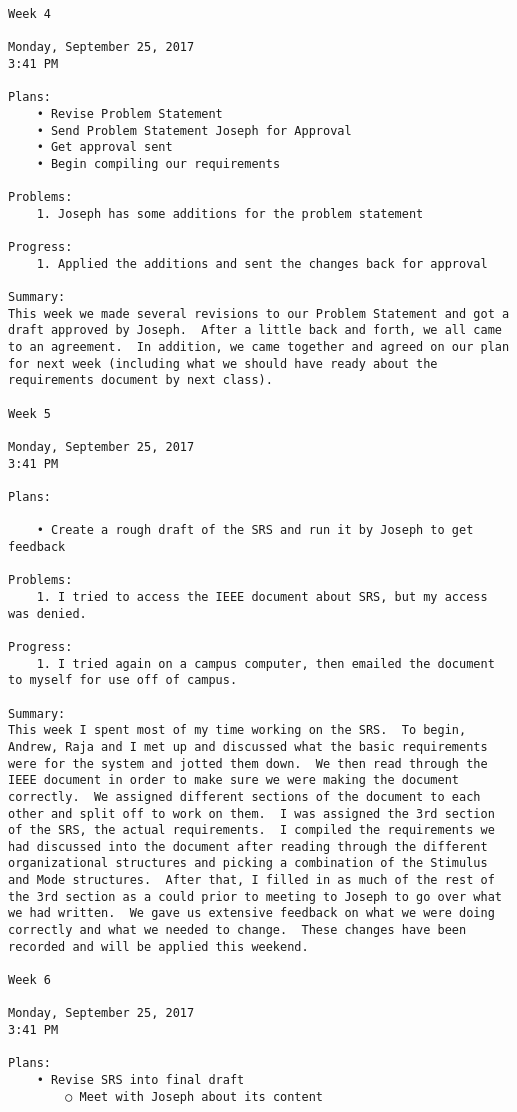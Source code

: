\begin{lstlisting}
Week 4

Monday, September 25, 2017
3:41 PM

Plans:
	• Revise Problem Statement
	• Send Problem Statement Joseph for Approval
	• Get approval sent
	• Begin compiling our requirements

Problems:
	1. Joseph has some additions for the problem statement

Progress:
	1. Applied the additions and sent the changes back for approval

Summary:
This week we made several revisions to our Problem Statement and got a draft approved by Joseph.  After a little back and forth, we all came to an agreement.  In addition, we came together and agreed on our plan for next week (including what we should have ready about the requirements document by next class).

Week 5

Monday, September 25, 2017
3:41 PM

Plans:

	• Create a rough draft of the SRS and run it by Joseph to get feedback

Problems:
	1. I tried to access the IEEE document about SRS, but my access was denied.  

Progress:
	1. I tried again on a campus computer, then emailed the document to myself for use off of campus.

Summary:
This week I spent most of my time working on the SRS.  To begin, Andrew, Raja and I met up and discussed what the basic requirements were for the system and jotted them down.  We then read through the IEEE document in order to make sure we were making the document correctly.  We assigned different sections of the document to each other and split off to work on them.  I was assigned the 3rd section of the SRS, the actual requirements.  I compiled the requirements we had discussed into the document after reading through the different organizational structures and picking a combination of the Stimulus and Mode structures.  After that, I filled in as much of the rest of the 3rd section as a could prior to meeting to Joseph to go over what we had written.  We gave us extensive feedback on what we were doing correctly and what we needed to change.  These changes have been recorded and will be applied this weekend.

Week 6

Monday, September 25, 2017
3:41 PM

Plans:
	• Revise SRS into final draft
		○ Meet with Joseph about its content


\end{lstlisting}
